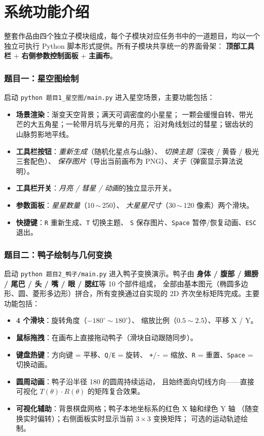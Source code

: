 \documentclass[12pt, a4paper]{article}
\begin{document}
\section{系统功能介绍}\label{sec:two}

整套作品由四个独立子模块组成，每个子模块对应任务书中的一道题目，均以一个
独立可执行 Python 脚本形式提供。所有子模块共享统一的界面骨架：
\textbf{顶部工具栏} + \textbf{右侧参数控制面板} + \textbf{主画布}。

\subsubsection*{题目一：星空图绘制}
启动 \texttt{python 题目1\_星空图/main.py} 进入星空场景，主要功能包括：
\begin{itemize}[leftmargin=*]
    \item \textbf{场景渲染}：渐变天空背景；满天可调密度的小星星；
    一颗会缓慢自转、带光芒的大五角星；一轮带月坑与光晕的月亮；
    沿对角线划过的彗星；锯齿状的山脉剪影地平线。
    \item \textbf{工具栏按钮}：\textit{重新生成}（随机化星点与山脉）、
    \textit{切换主题}（深夜 / 黄昏 / 极光三套配色）、
    \textit{保存图片}（导出当前画布为 PNG）、\textit{关于}（弹窗显示算法说明）。
    \item \textbf{工具栏开关}：\textit{月亮 / 彗星 / 动画}的独立显示开关。
    \item \textbf{参数面板}：\textit{星星数量}（10\,$\sim$\,250）、
    \textit{大星星尺寸}（30\,$\sim$\,120 像素）两个滑块。
    \item \textbf{快捷键}：\texttt{R} 重新生成、\texttt{T} 切换主题、
    \texttt{S} 保存图片、\texttt{Space} 暂停/恢复动画、\texttt{ESC} 退出。
\end{itemize}

\subsubsection*{题目二：鸭子绘制与几何变换}
启动 \texttt{python 题目2\_鸭子/main.py} 进入鸭子变换演示。鸭子由
\textbf{身体 / 腹部 / 翅膀 / 尾巴 / 头 / 嘴 / 眼 / 腮红}等 10 个部件组成，
全部由基本图元（椭圆多边形、圆、菱形多边形）拼合，所有变换通过自实现的
2D 齐次坐标矩阵完成。主要功能包括：
\begin{itemize}[leftmargin=*]
    \item \textbf{4 个滑块}：旋转角度（$-180^\circ \sim 180^\circ$）、
    缩放比例（$0.5 \sim 2.5$）、平移 X / Y。
    \item \textbf{鼠标拖拽}：在画布上直接拖动鸭子（滑块自动跟随同步）。
    \item \textbf{键盘热键}：方向键 = 平移、\texttt{Q}/\texttt{E} = 旋转、
    \texttt{+}/\texttt{-} = 缩放、\texttt{R} = 重置、\texttt{Space} = 切换动画。
    \item \textbf{圆周动画}：鸭子沿半径 180 的圆周持续运动，
    且始终面向切线方向——直接可视化 $T(\theta) \cdot R(\theta)$ 的矩阵复合效果。
    \item \textbf{可视化辅助}：背景棋盘网格；鸭子本地坐标系的红色 X 轴和绿色 Y 轴
    （随变换实时偏转）；右侧面板实时显示当前 $3 \times 3$ 变换矩阵；
    可选的运动轨迹绘制。
\end{itemize}
\end{document}
